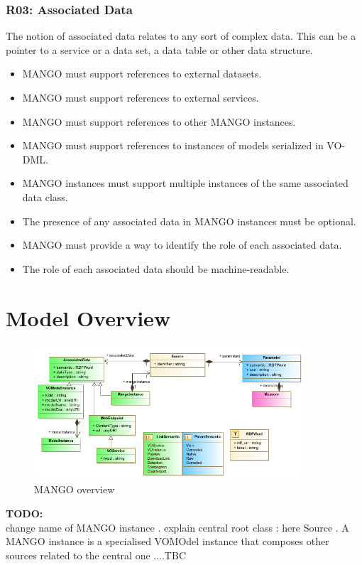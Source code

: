 \documentclass[11pt,a4paper]{ivoa}
\newcommand{\TODO}[1]{%
    \noindent%
    \colorbox{todocolor}{%
            \parbox{0.85\linewidth}{\sffamily \textbf{TODO:}\\
            #1}
    }%
    \vspace{2pt}

}
\begin{document}
\subsubsection{R03: Associated Data}
The notion of associated data relates to any sort of complex data. This can be a pointer to a service or a data set, a data table or  other data structure.
\begin{itemize}
    \item MANGO must support references to external datasets.
    \item MANGO must support references to external services.
    \item MANGO must support references to other MANGO instances.
    \item MANGO  must support references to instances of models serialized in VO-DML.
    \item MANGO instances must support multiple instances of the same associated data class.
    \item The presence of any associated data in MANGO instances must be optional.
    \item MANGO must provide a way to identify the role of each associated data.
    \item The role of each associated data should be machine-readable.
 \end{itemize}

\section{Model Overview}

\begin{figure}
\includegraphics[width=0.9\textwidth]{../model/overview_diagram.png}
\caption{MANGO overview}
\label{fig:overview}
\end{figure}
\TODO{ change name of MANGO instance .
explain central root class : here Source .
A MANGO instance is a specialised VOMOdel instance  that composes other sources related to the central one ....TBC}
\end{document}
